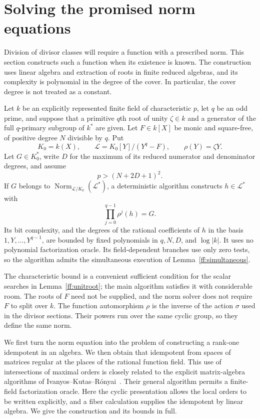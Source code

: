 \section{Solving the promised norm equations}
\label{sec:norms}

Division of divisor classes will require a function with a prescribed
norm.  This section constructs such a function when its existence is
known.  The construction uses linear algebra and extraction of roots in
finite reduced algebras, and its complexity is polynomial in the degree
of the cover.  In particular, the cover degree is not treated as a
constant.

\begin{theorem}\label{norm:solve}
Let $k$ be an explicitly represented finite field of characteristic $p$,
let $q$ be an odd prime, and suppose that a primitive $q$th root of unity
$\zeta\in k$ and a generator of the full $q$-primary subgroup of $k^*$
are given.  Let $F\in k[X]$ be monic and square-free, of positive degree
$N$ divisible by $q$.  Put
\[
 K_0=k(X),\qquad
 \mathcal L=K_0[Y]/(Y^q-F),\qquad \rho(Y)=\zeta Y.
\]
Let $G\in K_0^*$, write $D$ for the maximum of its reduced numerator
and denominator degrees, and assume
\begin{equation}\label{norm:characteristic}
 p>(N+2D+1)^2.
\end{equation}
If $G$ belongs to $\operatorname{Norm}_{\mathcal L/K_0}(\mathcal L^*)$, a deterministic
algorithm constructs $h\in \mathcal L^*$ with
\[
 \prod_{j=0}^{q-1}\rho^j(h)=G.
\]
Its bit complexity, and the degrees of the rational coefficients of
$h$ in the basis $1,Y,\ldots,Y^{q-1}$, are bounded by fixed polynomials
in $q,N,D$, and $\log|k|$.  It uses no polynomial factorization oracle.
Its field-dependent branches use only zero tests, so the algorithm
admits the simultaneous execution of Lemma~\ref{ff:simultaneous}.
\end{theorem}

The characteristic bound is a convenient sufficient condition for the
scalar searches in Lemma~\ref{ff:unitroot}; the main algorithm satisfies
it with considerable room.  The roots of $F$ need not be supplied, and
the norm solver does not require $F$ to split over $k$.
The function automorphism $\rho$ is the inverse of the action $\sigma$
used in the divisor sections. Their powers run over the same cyclic
group, so they define the same norm.

We first turn the norm equation into the problem of constructing a
rank-one idempotent in an algebra.  We then obtain that idempotent from
spaces of matrices regular at the places of the rational function
field.  This use of intersections of maximal orders is closely related
to the explicit matrix-algebra algorithms of
Ivanyos--Kutas--R\'onyai~\cite{IKR18}.  Their general algorithm permits a
finite-field factorization oracle.  Here the cyclic presentation
allows the local orders to be written explicitly, and a fiber
calculation supplies the idempotent by linear algebra.  We give the
construction and its bounds in full.

